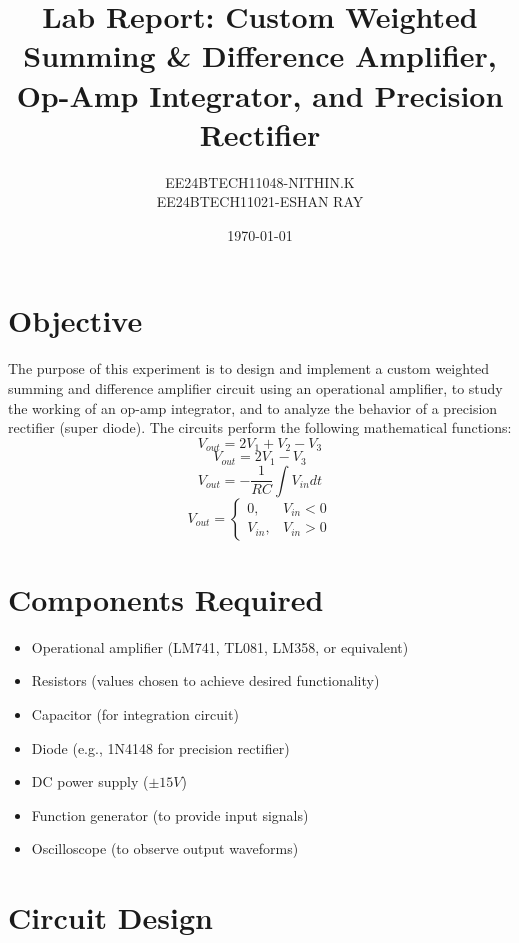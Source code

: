 \documentclass[a4paper,12pt]{article}
\title{\textbf{Lab Report: Custom Weighted Summing \& Difference Amplifier, Op-Amp Integrator, and Precision Rectifier}}
\author{EE24BTECH11048-NITHIN.K\\EE24BTECH11021-ESHAN RAY}
\date{\today}
\begin{document}
\maketitle

\section{Objective}
The purpose of this experiment is to design and implement a custom weighted summing and difference amplifier circuit using an operational amplifier, to study the working of an op-amp integrator, and to analyze the behavior of a precision rectifier (super diode). The circuits perform the following mathematical functions:
\begin{equation}
    V_{out} = 2V_1 + V_2 - V_3
\end{equation}
\begin{equation}
    V_{out} = 2V_1 - V_3
\end{equation}
\begin{equation}
    V_{out} = - \frac{1}{RC} \int V_{in} dt
\end{equation}
\begin{equation}
    V_{out} = \begin{cases} 
        0, & V_{in} < 0 \\ 
        V_{in}, & V_{in} > 0
    \end{cases}
\end{equation}
\section{Components Required}
\begin{itemize}
    \item Operational amplifier (LM741, TL081, LM358, or equivalent)
    \item Resistors (values chosen to achieve desired functionality)
    \item Capacitor (for integration circuit)
    \item Diode (e.g., 1N4148 for precision rectifier)
    \item DC power supply (\( \pm 15V \))
    \item Function generator (to provide input signals)
    \item Oscilloscope (to observe output waveforms)
\end{itemize}

\section{Circuit Design}
\end{document}

